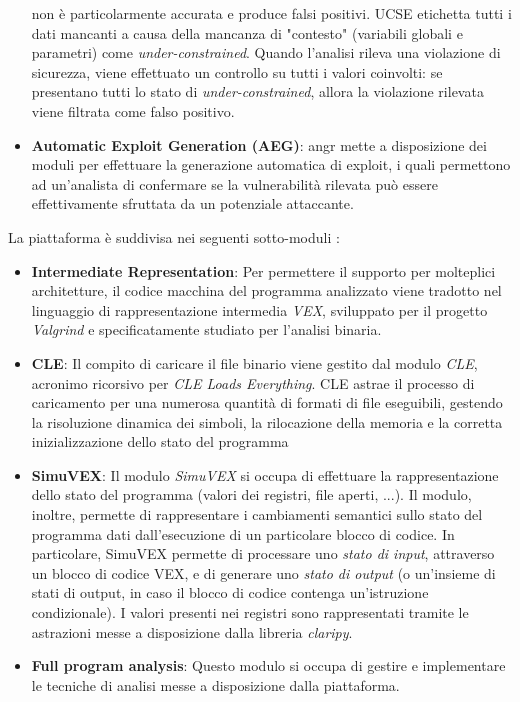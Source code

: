 \documentclass[../main.tex]{subfiles}
\begin{document}
\begin{itemize}
    non è particolarmente accurata e produce falsi positivi. UCSE etichetta tutti i dati mancanti a causa della mancanza di "contesto" (variabili globali e parametri) come \textit{under-constrained}. Quando l'analisi rileva una violazione di sicurezza, viene effettuato un controllo su tutti i valori coinvolti: se presentano tutti lo stato di \textit{under-constrained},
    allora la violazione rilevata viene filtrata come falso positivo.
    \item \textbf{Automatic Exploit Generation (AEG)}: angr mette a disposizione dei moduli per effettuare la generazione automatica di exploit, i quali permettono ad un'analista di confermare se la vulnerabilità rilevata può essere effettivamente sfruttata da un potenziale attaccante.
\end{itemize}
\newpage \noindent
La piattaforma è suddivisa nei seguenti sotto-moduli \cite{angr_introductory_paper}:
\begin{itemize}
    \item \textbf{Intermediate Representation}: Per permettere il supporto per molteplici architetture, il codice macchina del programma analizzato viene tradotto nel linguaggio di rappresentazione intermedia \textit{VEX}, sviluppato per il progetto \textit{Valgrind} e specificatamente studiato per l'analisi binaria.
    \item \textbf{CLE}: Il compito di caricare il file binario viene gestito dal modulo \textit{CLE}, acronimo ricorsivo per \textit{CLE Loads Everything}. CLE astrae il processo di caricamento per una numerosa quantità di formati di file eseguibili, gestendo la risoluzione dinamica dei simboli, la rilocazione della memoria
    e la corretta inizializzazione dello stato del programma
    \item \textbf{SimuVEX}: Il modulo \textit{SimuVEX} si occupa di effettuare la rappresentazione dello stato del programma (valori dei registri, file aperti, ...). Il modulo, inoltre, permette di rappresentare i cambiamenti semantici sullo stato del programma dati dall'esecuzione di un particolare blocco di codice. In particolare, SimuVEX permette
    di processare uno \textit{stato di input}, attraverso un blocco di codice VEX, e di generare uno \textit{stato di output} (o un'insieme di stati di output, in caso il blocco di codice contenga un'istruzione condizionale). I valori presenti nei registri sono rappresentati tramite le astrazioni messe a disposizione dalla libreria \textit{claripy}.
    \item \textbf{Full program analysis}: Questo modulo si occupa di gestire e implementare le tecniche di analisi messe a disposizione dalla piattaforma.
\end{itemize}
\end{document}
